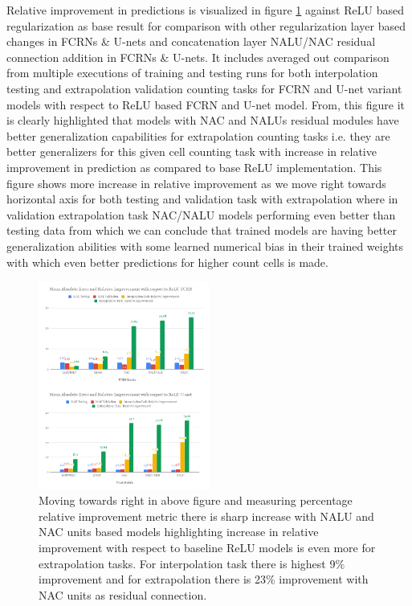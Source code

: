 \documentclass[conference]{IEEEtran}
\begin{document}
Relative improvement in predictions is visualized in figure \ref{fig10} against ReLU based regularization as base result for comparison with other regularization layer based changes in FCRNs \& U-nets and concatenation layer NALU/NAC residual connection addition in FCRNs \& U-nets. It includes averaged out comparison from multiple executions of training and testing runs for both interpolation testing and extrapolation validation counting tasks for FCRN and U-net variant models with respect to ReLU based FCRN and U-net model. From, this figure it is clearly highlighted that models with NAC and NALUs residual modules have better generalization capabilities for extrapolation counting tasks i.e. they are better generalizers for this given cell counting task with increase in relative improvement in prediction as compared to base ReLU implementation. This figure shows more increase in relative improvement as we move right towards horizontal axis for both testing and validation task with extrapolation where in validation extrapolation task NAC/NALU models performing even better than testing data from which we can conclude that trained models are having better generalization abilities with some learned numerical bias in their trained weights with which even better predictions for higher count cells is made.



\begin{figure}[!h]
\centering
\includegraphics[width=0.50\textwidth]{assets/merged-relative-improv-results.png}
\caption{Moving towards right in above figure and measuring percentage relative improvement metric there is sharp increase with NALU and NAC units based models highlighting increase in relative improvement with respect to baseline ReLU models is even more for extrapolation tasks. For interpolation task there is highest 9\% improvement and for extrapolation there is 23\% improvement with NAC units as residual connection.}
\label{fig10}
\end{figure}
\end{document}

